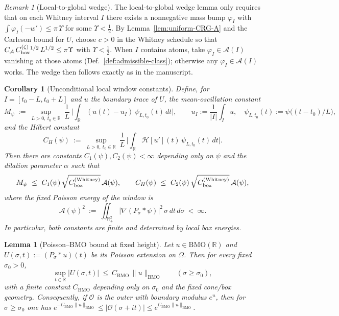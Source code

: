 \documentclass[11pt]{article}
\newtheorem{lemma}[theorem]{Lemma}
\newtheorem{corollary}[theorem]{Corollary}
\theoremstyle{definition}
\theoremstyle{remark}
\newtheorem{remark}[theorem]{Remark}
\newcommand{\R}{\mathbb{R}}
\begin{document}
\begin{remark}[Local-to-global wedge]\label{rem:wedge-application}
The local-to-global wedge lemma only requires that on each Whitney interval \(I\) there exists a nonnegative mass bump
\(\varphi_I\) with \(\int \varphi_I(-w')\le \pi\,\Upsilon\) for some \(\Upsilon<\tfrac12\).
By Lemma~\ref{lem:uniform-CRG-A} and the Carleson bound for \(U\),
choose \(c>0\) in the Whitney schedule so that
\(C_{\mathcal A}\,C_{\rm box}^{(\zeta)}{}^{1/2}\,L^{1/2}\le \pi\Upsilon\) with \(\Upsilon<\tfrac12\).
When \(I\) contains atoms, take \(\varphi_I\in\mathcal A(I)\) vanishing at those atoms (Def.~\ref{def:admissible-class});
otherwise any \(\varphi_I\in\mathcal A(I)\) works.
The wedge then follows exactly as in the manuscript.
\end{remark}
\begin{corollary}[Unconditional local window constants]\label{cor:CH-Mpsi-final}
Define, for $I=[t_0-L,t_0+L]$ and $u$ the boundary trace of $U$, the mean-oscillation constant
\[
  M_\psi\ :=\ \sup_{L>0,\ t_0\in\R}\ \frac{1}{L}\,\Big|\int_{\R} (u(t)-u_I)\,\psi_{L,t_0}(t)\,dt\Big|,\qquad u_I:=\frac{1}{|I|}\int_I u,\quad \psi_{L,t_0}(t):=\psi\big((t-t_0)/L\big),
\]
and the Hilbert constant
\[
  C_H(\psi)\ :=\ \sup_{L>0,\ t_0\in\R}\ \frac{1}{L}\,\Big|\int_{\R} \mathcal H[u'](t)\,\psi_{L,t_0}(t)\,dt\Big|.
\]
Then there are constants $C_1(\psi),C_2(\psi)<\infty$ depending only on $\psi$ and the dilation parameter $\alpha$ such that
\[
  M_\psi\ \le\ C_1(\psi)\,\sqrt{C_{\rm box}^{(\mathrm{Whitney})}}\,\mathcal A(\psi),\qquad
  C_H(\psi)\ \le\ C_2(\psi)\,\sqrt{C_{\rm box}^{(\mathrm{Whitney})}}\,\mathcal A(\psi),
\]
where the fixed Poisson energy of the window is
\[
  \mathcal A(\psi)^2\ :=\ \iint_{\R^2_+}|\nabla(P_\sigma*\psi)|^2\,\sigma\,dt\,d\sigma\ <\ \infty.
\]
In particular, both constants are finite and determined by local box energies.
\end{corollary}
\begin{lemma}[Poisson–BMO bound at fixed height]\label{lem:poisson-bmo-strip}
Let $u\in \mathrm{BMO}(\mathbb R)$ and $U(\sigma,t):=(P_\sigma*u)(t)$ be its Poisson extension on $\Omega$. Then for every fixed $\sigma_0>0$,
\[
\sup_{t\in\mathbb R}|U(\sigma,t)|\ \le\ C_{\mathrm{BMO}}\,\|u\|_{\mathrm{BMO}}\qquad(\sigma\ge \sigma_0),
\]
with a finite constant $C_{\mathrm{BMO}}$ depending only on $\sigma_0$ and the fixed cone/box geometry. Consequently, if $\mathcal O$ is the outer with boundary modulus $e^u$, then for $\sigma\ge \sigma_0$ one has $e^{-C_{\mathrm{BMO}}\|u\|_{\mathrm{BMO}}}\le |\mathcal O(\sigma+it)|\le e^{C_{\mathrm{BMO}}\|u\|_{\mathrm{BMO}}}$.
\end{lemma}
\end{document}
